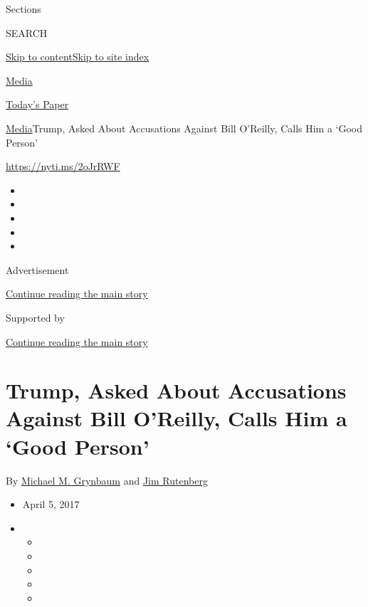 Sections

SEARCH

\protect\hyperlink{site-content}{Skip to
content}\protect\hyperlink{site-index}{Skip to site index}

\href{https://www.nytimes3xbfgragh.onion/section/business/media}{Media}

\href{https://myaccount.nytimes3xbfgragh.onion/auth/login?response_type=cookie\&client_id=vi}{}

\href{https://www.nytimes3xbfgragh.onion/section/todayspaper}{Today's
Paper}

\href{/section/business/media}{Media}\textbar{}Trump, Asked About
Accusations Against Bill O'Reilly, Calls Him a `Good Person'

\url{https://nyti.ms/2oJrRWF}

\begin{itemize}
\item
\item
\item
\item
\item
\end{itemize}

Advertisement

\protect\hyperlink{after-top}{Continue reading the main story}

Supported by

\protect\hyperlink{after-sponsor}{Continue reading the main story}

\hypertarget{trump-asked-about-accusations-against-bill-oreilly-calls-him-a-good-person}{%
\section{Trump, Asked About Accusations Against Bill O'Reilly, Calls Him
a `Good
Person'}\label{trump-asked-about-accusations-against-bill-oreilly-calls-him-a-good-person}}

By
\href{http://www.nytimes3xbfgragh.onion/by/michael-m-grynbaum}{Michael
M. Grynbaum} and
\href{http://www.nytimes3xbfgragh.onion/by/jim-rutenberg}{Jim Rutenberg}

\begin{itemize}
\item
  April 5, 2017
\item
  \begin{itemize}
  \item
  \item
  \item
  \item
  \item
  \end{itemize}
\end{itemize}

